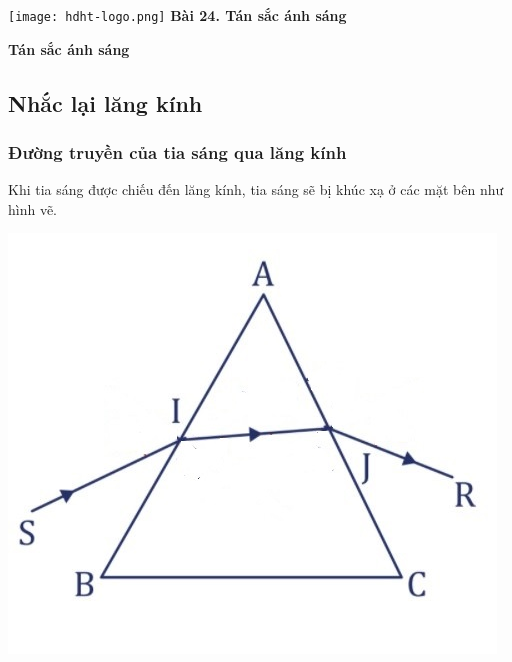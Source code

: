 \newcommand{\chapter}[2][]{
	\newcommand{\chapname}{#2}
	\begin{flushleft}
		\begin{minipage}[t]{\linewidth}
			\texttt{[image: hdht-logo.png]}
			\hspace{0pt}	
			\sffamily\bfseries\large Bài  24. Tán sắc ánh sáng
			\begin{flushleft}
				\huge\bfseries #1
			\end{flushleft}
		\end{minipage}
	\end{flushleft}
	\vspace{1cm}
	\normalfont\normalsize
}
\chapter[Tán sắc ánh sáng]{Tán sắc ánh sáng}


\subsection{Nhắc lại lăng kính}
\subsubsection{Đường truyền của tia sáng qua lăng kính}
Khi tia sáng được chiếu đến lăng kính, tia sáng sẽ bị khúc xạ ở các mặt bên như hình vẽ. 
\begin{center}
	\includegraphics[scale=0.4]{../figs/VN12-PH-32-L-019-1-1.jpg}
\end{center}

